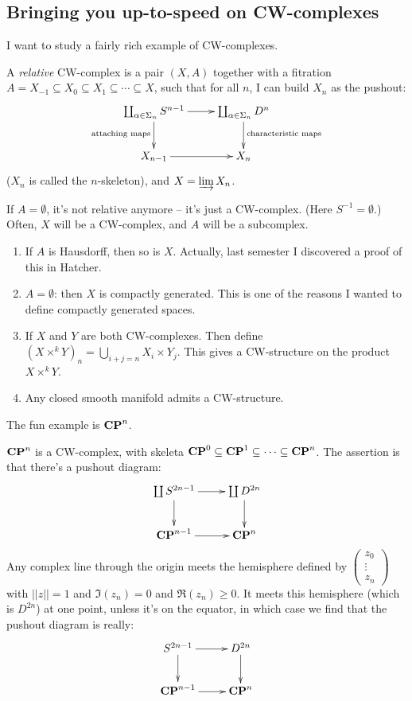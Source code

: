 \subsection{Bringing you up-to-speed on CW-complexes}
I want to study a fairly rich example of CW-complexes.
\begin{definition}
    A \emph{relative} CW-complex is a pair $(X,A)$ together with a fitration $A=X_{-1}\subseteq X_0\subseteq X_1\subseteq\cdots\subseteq X$, such that for all $n$, I can build $X_n$ as the pushout:
    $$
    \xymatrix{
	\coprod_{\alpha\in \Sigma_n}S^{n-1}\ar[r]\ar[d]_{\text{attaching maps}} & \coprod_{\alpha\in \Sigma_n}D^n\ar[d]^{\text{characteristic maps}}\\
	X_{n-1}\ar[r] & X_n
    }
    $$
    ($X_n$ is called the $n$-skeleton), and $X=\varinjlim X_n$.
\end{definition}
If $A=\emptyset$, it's not relative anymore -- it's just a CW-complex. (Here $S^{-1} = \emptyset$.) Often, $X$ will be a CW-complex, and $A$ will be a subcomplex.
\begin{enumerate}
    \item If $A$ is Hausdorff, then so is $X$. Actually, last semester I discovered a proof of this in Hatcher.
    \item $A=\emptyset$: then $X$ is compactly generated. This is one of the reasons I wanted to define compactly generated spaces.
    \item If $X$ and $Y$ are both CW-complexes. Then define $(X\times^k Y)_n = \bigcup_{i+j = n}X_i\times Y_j$. This gives a CW-structure on the product $X\times^k Y$.
    \item Any closed smooth manifold admits a CW-structure. 
\end{enumerate}
The fun example is $\mathbf{CP}^n$.
\begin{example}
    $\mathbf{CP}^n$ is a CW-complex, with skeleta $\mathbf{CP}^0\subseteq\mathbf{CP}^1\subseteq\cdots\subseteq \mathbf{CP}^n$. The assertion is that there's a pushout diagram:
    \begin{equation*}
	\xymatrix{
	    \coprod S^{2n-1}\ar[r]\ar[d] & \coprod D^{2n}\ar[d]\\
	    \CP^{n-1}\ar[r] & \CP^n
	    }
    \end{equation*}
    Any complex line through the origin meets the hemisphere defined by $\begin{pmatrix}z_0\\\vdots\\z_n\end{pmatrix}$ with $||z||=1$ and $\Im(z_n) = 0$ and $\Re(z_n)\geq 0$. It meets this hemisphere (which is $D^{2n}$) at one point, unless it's on the equator, in which case we find that the pushout diagram is really:
    \begin{equation*}
	\xymatrix{
	    S^{2n-1}\ar[r]\ar[d] & D^{2n}\ar[d]\\
	    \CP^{n-1}\ar[r] & \CP^n
	    }
    \end{equation*}
\end{example}
